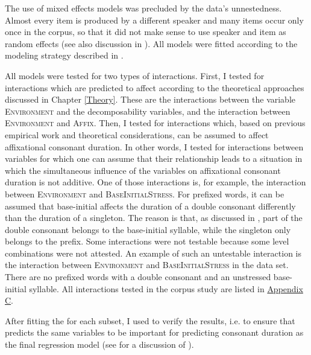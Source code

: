 The use of mixed effects models was precluded by the data's unnestedness. Almost every item is produced by a different speaker and many items occur only once in the corpus, so that it did not make sense to use speaker and item as random effects (see also discussion in ). All models were fitted according to the modeling strategy described in .



All models were tested for two types of  interactions. First, I tested for interactions which are predicted to affect  according to the theoretical approaches discussed in Chapter \ref{Theory}. These  are the interactions between the variable \textsc{Environment} and the decomposability variables, and the interaction between \textsc{Environment} and \textsc{Affix}.
Then, I tested for interactions which, based on previous empirical work and theoretical considerations, can be assumed to affect affixational consonant duration. In other words, I tested for interactions between variables for which one can assume that their relationship leads to a situation in which the simultaneous influence of the variables on affixational consonant duration is not additive. One of those interactions is, for example, the interaction between \textsc{Environment} and \textsc{BaseInitialStress}. For prefixed words, it can be assumed that base-initial  affects the duration of a double consonant differently than the duration of a singleton. The reason is that, as discussed in , part of the double consonant belongs to the base-initial syllable, while the singleton only belongs to the prefix. 
Some interactions were not testable because some level combinations were not attested. An example of such an untestable interaction is the interaction between \textsc{Environment} and \textsc{BaseInitialStress} in the data set. There are no prefixed words with a double consonant and an unstressed base-initial syllable. All interactions tested in the corpus study are listed in \hyperref[Appendix C: Summaries of tested interactions in corpus study]{Appendix C}.

After fitting the  for each subset, I used  to verify the results, i.e. to ensure that  predicts the same variables to be important for predicting consonant duration as the final regression model (see  for a discussion of ).




